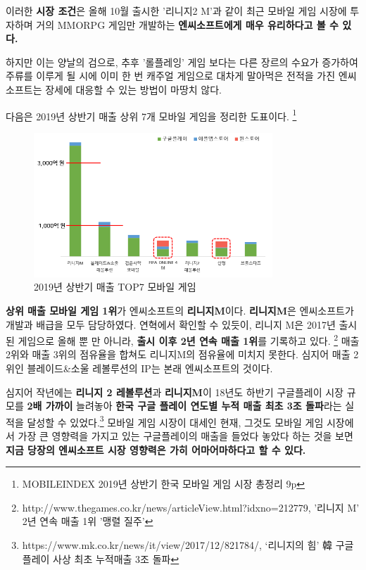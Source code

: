 \documentclass[11pt]{oblivoir}
\begin{document}
		이러한 \textbf{시장 조건}은 올해 10월 출시한 '리니지2 M'과 같이 최근 모바일 게임 시장에 투자하며 거의 MMORPG 게임만 개발하는 \textbf{엔씨소프트에게 매우 유리하다고 볼 수 있다.} 
		
		하지만 이는 양날의 검으로, 추후 '롤플레잉' 게임 보다는 다른 장르의 수요가 증가하여 주류를 이루게 될 시에 이미 한 번 캐주얼 게임으로 대차게 말아먹은 전적을 가진 엔씨소프트는 장세에 대응할 수 있는 방법이 마땅치 않다.
	
		다음은 2019년 상반기 매출 상위 7개 모바일 게임을 정리한 도표이다.  \footnote{MOBILEINDEX 2019년 상반기 한국 모바일 게임 시장 총정리 9p}
		\begin{figure}[htbp]
			\centering
			\includegraphics[width=0.8\textwidth]{Pictures/Sangbangi.png}
			\caption{2019년 상반기 매출 TOP7 모바일 게임}
		\end{figure}

		\textbf{상위 매출 모바일 게임 1위}가 엔씨소프트의 \textbf{리니지M}이다. \textbf{리니지M}은 엔씨소프트가 개발과 배급을 모두 담당하였다. 연혁에서 확인할 수 있듯이, 리니지 M은 2017년 출시된 게임으로 올해 뿐 만 아니라, \textbf{출시 이후 2년 연속 매출 1위}를 기록하고 있다.
		\footnote{http://www.thegames.co.kr/news/articleView.html?idxno=212779, '리니지 M' 2년 연속 매출 1위 '맹렬 질주'}
		매출 2위와 매출 3위의 점유율을 합쳐도 리니지M의 점유율에 미치지 못한다. 심지어 매출 2위인 블레이드\&소울 레볼루션의 IP는 본래 엔씨소프트의 것이다.
		
		심지어 작년에는 \textbf{리니지 2 레볼루션}과 
		\textbf{리니지M}이 18년도 하반기 구글플레이 시장 규모를 \textbf{2배 가까이} 늘려놓아 \textbf{한국 구글 플레이 연도별 누적 매출 최초 3조 돌파}라는 실적을 달성할 수 있었다.\footnote{https://www.mk.co.kr/news/it/view/2017/12/821784/, ‘리니지의 힘’ 韓 구글 플레이 사상 최초 누적매출 3조 돌파} 모바일 게임 시장이 대세인 현재, 그것도 모바일 게임 시장에서 가장 큰 영향력을 가지고 있는 구글플레이의 매출을 들었다 놓았다 하는 것을 보면 \textbf{지금 당장의 엔씨소프트 시장 영향력은 가히 어마어마하다고 할 수 있다.}
		
\end{document}

